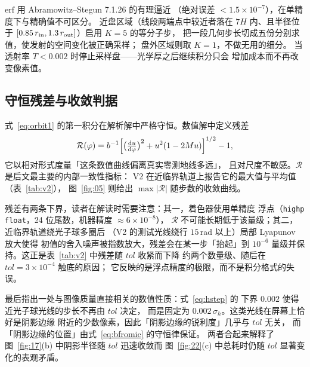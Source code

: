$\mathrm{erf}$ 用 Abramowitz--Stegun 7.1.26 的有理逼近
（绝对误差 $<1.5\times10^{-7}$），在单精度下与精确值不可区分。
近盘区域（线段两端点中较近者落在 $7H$ 内、且半径位于
$[0.85\,r_{\mathrm{in}},1.3\,r_{\mathrm{out}}]$）启用 $K=5$ 的等分子步，
把一段几何步长切成五份分别求值，使发射的空间变化被正确采样；
盘外区域则取 $K=1$，不做无用的细分。
当透射率 $T<0.002$ 时停止采样盘——光学厚之后继续积分只会
增加成本而不再改变像素值。

\subsection{守恒残差与收敛判据}\label{sec:residual}

式~\eqref{eq:orbit1} 的第一积分在解析解中严格守恒。数值解中定义残差
\begin{equation}
\mathcal R(\varphi)
=b^{-1}\Bigl[\bigl(\tfrac{\mathrm{d} u}{\mathrm{d}\varphi}\bigr)^{2}
+u^{2}(1-2M u)\Bigr]^{1/2}-1,
\label{eq:resid}
\end{equation}
它以相对形式度量「这条数值曲线偏离真实零测地线多远」，
且对尺度不敏感。$\mathcal R$ 是后文最主要的内部一致性指标：
V2 在近临界轨道上报告它的最大值与平均值（表~\ref{tab:v2}），
图~\ref{fig:05} 则给出 $\max|\mathcal R|$ 随步数的收敛曲线。

残差有两条下界，读者在解读时需要注意：其一，着色器使用单精度
浮点（\texttt{highp float}，24 位尾数，机器精度 $\approx6\times10^{-8}$），
$\mathcal R$ 不可能长期低于该量级；其二，近临界轨道绕光子球多圈后
（V2 的测试光线绕行 $15$\,rad 以上）局部 Lyapunov 放大使得
初值的舍入噪声被指数放大，残差会在某一步「抬起」到
$10^{-6}$ 量级并保持。这正是表~\ref{tab:v2} 中残差随 $tol$ 收紧而下降
约两个数量级、随后在 $tol=3\times10^{-4}$ 触底的原因；
它反映的是浮点精度的极限，而不是积分格式的失误。

最后指出一处与图像质量直接相关的数值性质：式~\eqref{eq:hstep} 的
下界 $0.002$ 使得近光子球光线的步长不再由 $tol$ 决定，
而是固定为 $0.002\,\sigma_h$。这类光线在屏幕上恰好是阴影边缘
附近的少数像素，因此「阴影边缘的锐利度」几乎与 $tol$ 无关，
而「阴影边缘的位置」由式~\eqref{eq:bfromic} 的守恒律保证。
两者合起来解释了图~\ref{fig:17}(b) 中阴影半径随 $tol$ 迅速收敛而
图~\ref{fig:22}(c) 中总耗时仍随 $tol$ 显著变化的表观矛盾。
